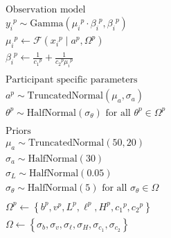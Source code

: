 \documentclass[a4paper,12pt]{article}
\begin{document}
\begin{align*}
    &\text{Observation model} \\
    &{y_i}^{p}\sim \text{Gamma}\left({\mu_i}^{p}\cdot{\beta_i}^{p}, {\beta_i}^{p}\right) \\
    &{\mu_i}^{p} \gets \mathcal{F}\left({x_i}^{p} \mid a^{p}, {\Omega}^{p}\right) \\
    &{\beta_i}^{p} \gets \frac1{{c_1}^{p}} + \frac1{{c_2}^{p}{\mu_i}^{p}}\\\\
    &\text{Participant specific parameters} \\
    &a^{p} \sim \text{TruncatedNormal}\left({\mu_a}, {\sigma_a}\right)\\
    &{\theta}^{p} \sim \text{HalfNormal}\left({\sigma_{\theta}}\right) \text{ for all } \theta^{p} \in {\Omega}^{p}\\\\
    &\text{Priors} \\
    & {\mu_a} \sim \text{TruncatedNormal}\left(50, 20\right)\\
    &{\sigma_a} \sim \text{HalfNormal}\left(30\right)\\
    &{\sigma_L} \sim \text{HalfNormal}\left(0.05\right)\\
    &{\sigma_\theta} \sim \text{HalfNormal}\left(5\right) \text{ for all } {\sigma_\theta}\in \Omega\\\\
    &{\Omega}^{p} \gets \left\{{b}^{p}, {v}^{p}, {L}^{p}, {\ell}^{p}, {H}^{p}, {c_1}^{p}, {c_2}^{p}\right\}\\
    &\Omega \gets \left\{{\sigma_{b}}, {\sigma_{v}},  {\sigma_{\ell}}, {\sigma_{H}}, {\sigma_{c_1}}, {\sigma_{c_2}}\right\}
\end{align*}
\end{document}
